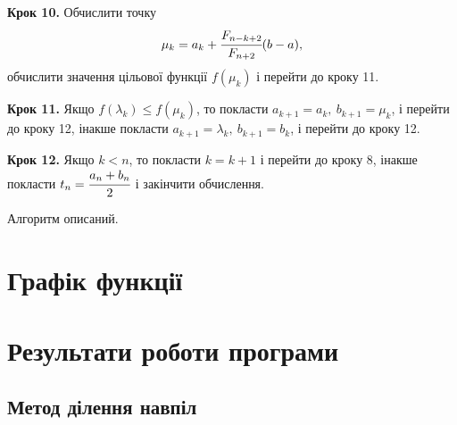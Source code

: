 \documentclass[14pt,a4paper]{extarticle}
\theoremstyle{definition}
\newcommand{\sep}{ , \ \allowbreak }
\begin{document}
\textbf{Крок 10.} Обчислити точку
\[\mu_k = a_k+\cfrac{F_{n-k+2}}{F_{n+2}}(b-a),\]
обчислити значення цільової функції $f(\mu_k)$ і перейти до кроку 11.

\textbf{Крок 11.} Якщо $f(\lambda_{k}) \leq f(\mu_{k})$, то покласти $a_{k+1}=a_k \sep b_{k+1}=\mu_k$, і перейти до кроку 12, інакше покласти $a_{k+1}=\lambda_k \sep b_{k+1} = b_k$, і перейти до кроку 12.

\textbf{Крок 12.} Якщо $k < n$, то покласти $k=k+1$ і перейти до кроку 8, інакше покласти $t_n=\cfrac{a_n+b_n}2$ і закінчити обчислення.

Алгоритм описаний.

\section{Графік функції}

\begin{center}
\end{center}


\section{Результати роботи програми}

\subsection{Метод ділення навпіл}
\end{document}
